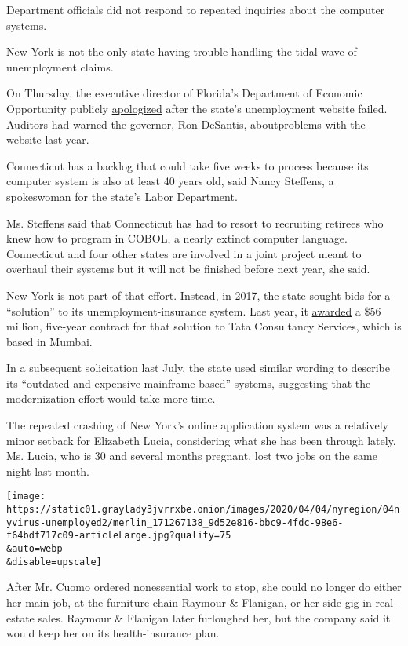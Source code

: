 Department officials did not respond to repeated inquiries about the
computer systems.

New York is not the only state having trouble handling the tidal wave of
unemployment claims.

On Thursday, the executive director of Florida's Department of Economic
Opportunity publicly
\href{https://www.tampabay.com/news/health/2020/04/02/i-apologize-for-floridas-unemployment-website-fiasco-director-says/}{apologized}
after the state's unemployment website failed. Auditors had warned the
governor, Ron DeSantis,
about\href{https://www.tampabay.com/news/health/2020/03/31/ron-desantis-was-warned-about-floridas-broken-unemployment-website-last-year-audit-shows/}{problems}
with the website last year.

Connecticut has a backlog that could take five weeks to process because
its computer system is also at least 40 years old, said Nancy Steffens,
a spokeswoman for the state's Labor Department.

Ms. Steffens said that Connecticut has had to resort to recruiting
retirees who knew how to program in COBOL, a nearly extinct computer
language. Connecticut and four other states are involved in a joint
project meant to overhaul their systems but it will not be finished
before next year, she said.

New York is not part of that effort. Instead, in 2017, the state sought
bids for a ``solution'' to its unemployment-insurance system. Last year,
it
\href{https://www.osc.state.ny.us/press/releases/july19/070119.htm}{awarded}
a \$56 million, five-year contract for that solution to Tata Consultancy
Services, which is based in Mumbai.

In a subsequent solicitation last July, the state used similar wording
to describe its ``outdated and expensive mainframe-based'' systems,
suggesting that the modernization effort would take more time.

The repeated crashing of New York's online application system was a
relatively minor setback for Elizabeth Lucia, considering what she has
been through lately. Ms. Lucia, who is 30 and several months pregnant,
lost two jobs on the same night last month.

\texttt{[image: https://static01.graylady3jvrrxbe.onion/images/2020/04/04/nyregion/04nyvirus-unemployed2/merlin\_171267138\_9d52e816-bbc9-4fdc-98e6-f64bdf717c09-articleLarge.jpg?quality=75\\\&auto=webp\\\&disable=upscale]}

After Mr. Cuomo ordered nonessential work to stop, she could no longer
do either her main job, at the furniture chain Raymour \& Flanigan, or
her side gig in real-estate sales. Raymour \& Flanigan later furloughed
her, but the company said it would keep her on its health-insurance
plan.

